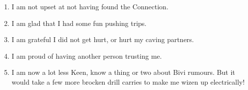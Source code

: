 \begin{enumerate}
\def\labelenumi{\arabic{enumi}.}
\item
  I am not upset at not having found the Connection.
\item
  I am glad that I had some fun pushing trips.
\item
  I am grateful I did not get hurt, or hurt my caving partners.
\item
  I am proud of having another person trusting me.
\item
  I am now a lot less Keen, know a thing or two about Bivi rumours. But
  it would take a few more brocken drill carries to make me wizen up
  electrically!
\end{enumerate}

